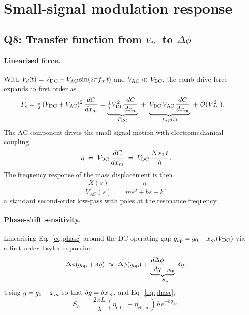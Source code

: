 \section{Small-signal modulation response}

\subsection*{Q8: Transfer function from $V_{\mathrm{AC}}$ to $\Delta\phi$}

\paragraph{Linearised force.} With $V_{d}(t)=V_{\mathrm{DC}} + V_{\mathrm{AC}}\sin(2\pi f_{m}t)$ and
$V_{\mathrm{AC}}\ll V_{\mathrm{DC}}$, the comb-drive force expands to first order as
\begin{align}
  F_{e} &= \tfrac{1}{2}\,(V_{\mathrm{DC}}+V_{\mathrm{AC}})^{2}\,\frac{dC}{dx_{m}}
       = \underbrace{\tfrac{1}{2}V_{\mathrm{DC}}^{2}\frac{dC}{dx_{m}}}_{F_{\mathrm{DC}}}
         \;+\;
         \underbrace{V_{\mathrm{DC}}\,V_{\mathrm{AC}}\,\frac{dC}{dx_{m}}}_{f_{\mathrm{AC}}(t)}
         \;+\;\mathcal{O}(V_{\mathrm{AC}}^{2}).
\end{align}
The AC component drives the small-signal motion with electromechanical
coupling
\begin{equation}
  \eta \;=\; V_{\mathrm{DC}}\,\frac{dC}{dx_{m}} \;=\; V_{\mathrm{DC}}\,\frac{N\,\varepsilon_{0}\,t}{h}.
  \label{eq:eta}
\end{equation}
The frequency response of the mass displacement is then
\begin{equation}
  \frac{X(s)}{V_{\!AC}(s)} \;=\; \frac{\eta}{m s^{2} + b s + k},
  \label{eq:Hxv}
\end{equation}
a standard second-order low-pass with poles at the resonance frequency.

\paragraph{Phase-shift sensitivity.} Linearising Eq.~\ref{eq:phase} around
the DC operating gap $g_{\mathrm{op}}=g_{0}+x_{m}(V_{\mathrm{DC}})$ via a first-order
Taylor expansion,
\begin{equation}
  \Delta\phi(g_{\mathrm{op}}+\delta g) \;\approx\;
  \Delta\phi(g_{\mathrm{op}})
    + \underbrace{\Bigl.\frac{d\Delta\phi}{dg}\Bigr|_{g_{\mathrm{op}}}}_{\equiv\,S_{\phi}}\,\delta g.
\end{equation}
Using $g=g_{0}+x_{m}$ so that $\delta g = \delta x_{m}$, and Eq.~\ref{eq:phase},
\begin{equation}
  \boxed{\;
  S_{\phi} \;=\; \frac{2\pi L}{\lambda}\,
                 (\eta_{\mathrm{eff},0}-\eta_{\mathrm{eff},\infty})\,
                 b\,e^{-b\,g_{\mathrm{op}}}.\;}
\end{equation}

